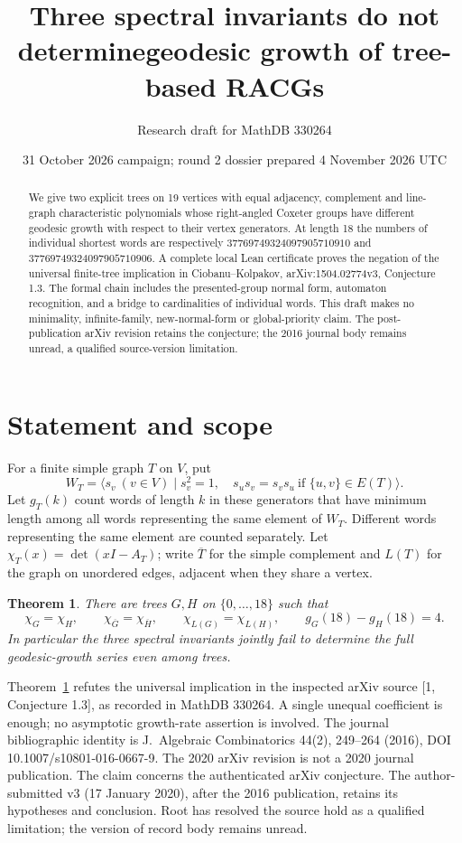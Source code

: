 \documentclass[11pt]{article}
\title{Three spectral invariants do not determine\newline geodesic growth of tree-based RACGs}
\author{Research draft for MathDB 330264}
\date{31 October 2026 campaign; round 2 dossier prepared 4 November 2026 UTC}
\newtheorem{theorem}{Theorem}
\begin{document}
\maketitle
\begin{abstract}
We give two explicit trees on 19 vertices with equal adjacency, complement and line-graph characteristic polynomials whose right-angled Coxeter groups have different geodesic growth with respect to their vertex generators. At length 18 the numbers of individual shortest words are respectively
\(37769749324097905710910\) and \(37769749324097905710906\).
A complete local Lean certificate proves the negation of the universal finite-tree implication in Ciobanu--Kolpakov, arXiv:1504.02774v3, Conjecture 1.3. The formal chain includes the presented-group normal form, automaton recognition, and a bridge to cardinalities of individual words. This draft makes no minimality, infinite-family, new-normal-form or global-priority claim. The post-publication arXiv revision retains the conjecture; the 2016 journal body remains unread, a qualified source-version limitation.
\end{abstract}
\section{Statement and scope}
For a finite simple graph \(T\) on \(V\), put
\[
 W_T=\langle s_v\ (v\in V)\mid s_v^2=1,\quad
 s_us_v=s_vs_u\ \text{if }\{u,v\}\in E(T)\rangle.
\]
Let \(g_T(k)\) count words of length \(k\) in these generators that have minimum length among all words representing the same element of \(W_T\). Different words representing the same element are counted separately. Let \(\chi_T(x)=\det(xI-A_T)\); write \(\overline T\) for the simple complement and \(L(T)\) for the graph on unordered edges, adjacent when they share a vertex.
\begin{theorem}\label{thm}
There are trees \(G,H\) on \(\{0,\ldots,18\}\) such that
\[
\chi_G=\chi_H,\qquad \chi_{\overline G}=\chi_{\overline H},\qquad
\chi_{L(G)}=\chi_{L(H)},\qquad g_G(18)-g_H(18)=4.
\]
In particular the three spectral invariants jointly fail to determine the full geodesic-growth series even among trees.
\end{theorem}
Theorem~\ref{thm} refutes the universal implication in the inspected arXiv source [1, Conjecture 1.3], as recorded in MathDB 330264. A single unequal coefficient is enough; no asymptotic growth-rate assertion is involved. The journal bibliographic identity is J.~Algebraic Combinatorics 44(2), 249--264 (2016), DOI 10.1007/s10801-016-0667-9. The 2020 arXiv revision is not a 2020 journal publication. The claim concerns the authenticated arXiv conjecture. The author-submitted v3 (17 January 2020), after the 2016 publication, retains its hypotheses and conclusion. Root has resolved the source hold as a qualified limitation; the version of record body remains unread.
\newpage
\end{document}

